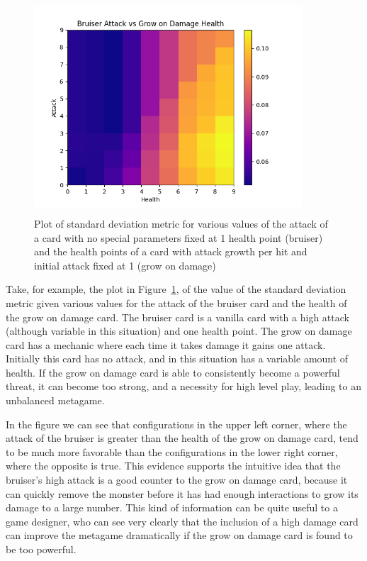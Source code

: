 \begin{figure}[t]
	\includegraphics[width=10cm, height=8cm]{bruiser_vs_grow} 
	\caption{Plot of standard deviation metric for various values of the attack of a card with no special parameters fixed at 1 health point (bruiser) and the health points of a card with attack growth per hit and initial attack fixed at 1 (grow on damage)}
	\label{fig:bruiser_vs_grow}
\end{figure}

Take, for example, the plot in Figure~\ref{fig:bruiser_vs_grow}, of the value of the standard deviation metric given various values for the attack of the bruiser card and the health of the grow on damage card. The bruiser card is a vanilla card with a high attack (although variable in this situation) and one health point. The grow on damage card has a mechanic where each time it takes damage it gains one attack. Initially this card has no attack, and in this situation has a variable amount of health. If the grow on damage card is able to consistently become a powerful threat, it can become too strong, and a necessity for high level play, leading to an unbalanced metagame.

In the figure we can see that configurations in the upper left corner, where the attack of the bruiser is greater than the health of the grow on damage card, tend to be much more favorable than the configurations in the lower right corner, where the opposite is true. This evidence supports the intuitive idea that the bruiser's high attack is a good counter to the grow on damage card, because it can quickly remove the monster before it has had enough interactions to grow its damage to a large number. This kind of information can be quite useful to a game designer, who can see very clearly that the inclusion of a high damage card can improve the metagame dramatically if the grow on damage card is found to be too powerful.

